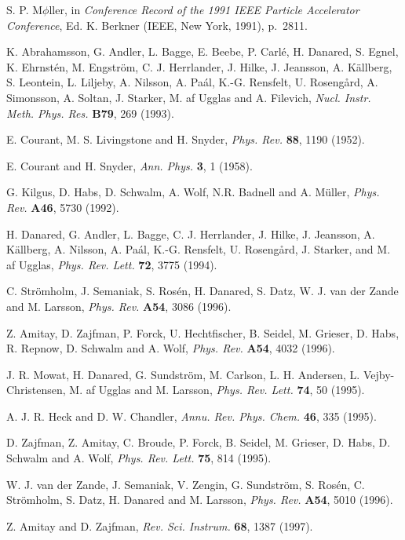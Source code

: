 \documentclass{ws-rv9x6}
\begin{document}
\begin{thebibliography}{000}
S. P. M$\phi$ller, in {\it Conference Record of the 1991 IEEE Particle
Accelerator Conference}, Ed. K. Berkner (IEEE, New York, 1991),
p.~2811.

 K. Abrahamsson, G. Andler, L. Bagge, E. Beebe,
P. Carl\'e, H. Danared, S. Egnel, K. Ehrnst\'en, M. Engstr\"om,
C. J. Herrlander, J.  Hilke, J. Jeansson, A. K\"allberg, S. Leontein,
L. Liljeby, A.  Nilsson, A. Pa\'al, K.-G. Rensfelt, U. Roseng\aa rd,
A.  Simonsson, A. Soltan, J. Starker, M. af Ugglas and A. Filevich,
{\it Nucl. Instr. Meth. Phys. Res.} {\bf B79}, 269 (1993).

E. Courant, M. S. Livingstone and H. Snyder, {\it Phys. Rev.} {\bf
88}, 1190 (1952).

E. Courant and H. Snyder, {\it Ann. Phys.} {\bf 3}, 1 (1958).

G. Kilgus, D. Habs, D. Schwalm, A. Wolf, N.R. Badnell and A. M\"uller,
{\it Phys. Rev.} {\bf A46}, 5730 (1992).

H. Danared, G. Andler, L. Bagge, C. J. Herrlander, J. Hilke,
J. Jeansson, A. K\"allberg, A. Nilsson, A. Pa\'al, K.-G. Rensfelt, U. Roseng\aa rd,
J. Starker, and M. af Ugglas, {\it Phys. Rev. Lett.} {\bf 72}, 3775
(1994).

C. Str\"omholm, J. Semaniak, S. Ros\'en, H. Danared, S. Datz,
W. J. van der Zande and M. Larsson, {\it Phys.  Rev.} {\bf A54}, 3086
(1996).

Z. Amitay, D. Zajfman, P. Forck, U. Hechtfischer, B. Seidel,
M. Grieser, D. Habs, R. Repnow, D. Schwalm and A. Wolf, {\it Phys. Rev.} {\bf
A54}, 4032 (1996).

J. R. Mowat, H. Danared, G. Sundstr\"om, M. Carlson,
L. H. Andersen, L. Vejby-Christensen, M. af Ugglas and M. Larsson, {\it Phys.
Rev. Lett.} {\bf 74}, 50 (1995).

A. J. R. Heck and D. W. Chandler, {\it Annu. Rev. Phys. Chem.} {\bf
46}, 335 (1995).

D. Zajfman, Z. Amitay, C. Broude, P. Forck, B. Seidel, M. Grieser,
D. Habs, D. Schwalm and A. Wolf, {\it Phys.  Rev. Lett.} {\bf 75}, 814
(1995).

W. J. van der Zande, J. Semaniak, V. Zengin, G. Sundstr\"om,
S. Ros\'en, C. Str\"omholm, S. Datz, H. Danared and M. Larsson, {\it Phys. Rev.}
{\bf A54}, 5010 (1996).

Z. Amitay and D. Zajfman, {\it Rev. Sci. Instrum.} {\bf 68}, 1387
(1997).


\end{thebibliography}
\end{document}
